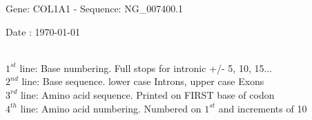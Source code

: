 \documentclass{article}
\begin{document}
\renewcommand{\footrulewidth}{1pt}
\renewcommand{\headrulewidth}{0pt}
\begin{center}
\begin{large}
 Gene: COL1A1 - Sequence: NG\_007400.1
 
 Date : \today\\\\
\end{large}
\end{center}
$1^{st}$ line: Base numbering. Full stops for intronic +/- 5, 10, 15...\\
$2^{nd}$ line: Base sequence. lower case Introns, upper case Exons\\
$3^{rd}$ line: Amino acid sequence. Printed on FIRST base of codon\\
$4^{th}$ line: Amino acid numbering. Numbered on $1^{st}$ and increments of 10\\
\end{document}
